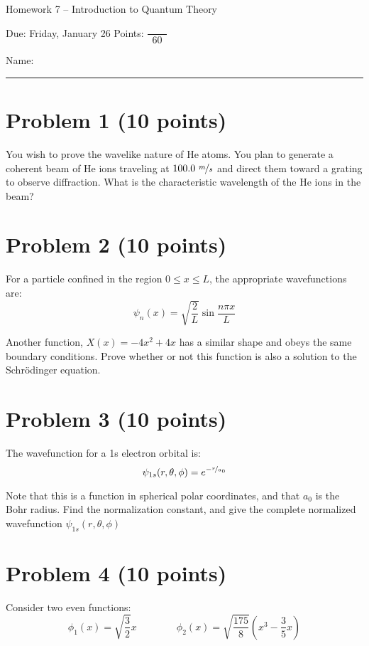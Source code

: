 \documentclass[10pt, letterpaper]{memoir}
\begin{document}
\begin{center}
	{\large Homework 7 -- Introduction to Quantum Theory}
	
	Due: Friday, January 26 \hspace{3em} Points: ${\dfrac{~}{~~60~~}}$
\end{center}

Name: \rule[-.1mm]{15em}{0.1pt}	
	
	\section*{Problem 1  (10 points)}
	You wish to prove the wavelike nature of He atoms. You plan to generate a coherent beam of He ions traveling at $100.0~\nicefrac{m}{s}$ and direct them toward a grating to observe diffraction. What is the characteristic wavelength of the He ions in the beam? 

	\vspace{15em}	
	\section*{Problem 2 (10 points)}
	For a particle confined in the region $0\leq x \leq L$, the appropriate wavefunctions are:	
	\begin{equation*}
		\psi_n(x) = \sqrt{\dfrac{2}{L}}\sin{\frac{n\pi x}{L}}
	\end{equation*}
		
	\noindent
	Another function, $X(x) = -4x^2+4x$ has a similar shape and obeys the same boundary conditions. Prove whether or not this function is also a solution to the Schr\"odinger equation.
	
	\vspace{25em}
	\section*{Problem 3 (10 points)}
	The wavefunction for a 1s electron orbital is:	
	\begin{equation*}
		\psi_{1s}(r,\theta,\phi) = e^{-\nicefrac{r}{a_0}}
	\end{equation*}
	
	\noindent
	Note that this is a function in spherical polar coordinates, and that $a_0$ is the Bohr radius. Find the normalization constant, and give the complete normalized wavefunction $\psi_{1s}(r,\theta,\phi)$
	
	\vspace{22em}
	\section*{Problem 4 (10 points)}
	Consider two even functions:
	\begin{equation*}
		\phi_1(x) = \sqrt{\dfrac{3}{2}}x \hspace{4em} \phi_2(x) = \sqrt{\dfrac{175}{8}}\left(x^3-\dfrac{3}{5}x\right)
	\end{equation*}
	
\end{document}
